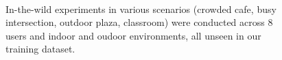 \documentclass [11pt, proquest] {uwthesis}[2020/02/24]
\begin{document}


\begin{figure}
\centering  
 \hfill
{} \hfill
{} \hfill
{}\\
\vskip -0.15in
\caption{{In-the-wild experiments in various  scenarios (crowded cafe, busy intersection, outdoor plaza, classroom)}  were conducted across 8 users and indoor and oudoor  environments, all unseen in our training dataset.}
\label{fig:picsenv}
\vskip -0.2in
\end{figure}
\end{document}
